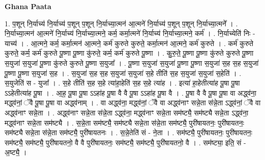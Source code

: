 \documentclass[17pt]{extarticle}
\begin{document}
\textbf{Ghana Paata } \newline

1. प॒शून् नि॒र्याच्य॑ नि॒र्याच्य॑ प॒शून् प॒शून् नि॒र्याच्या॒त्मन॑ आ॒त्मने॑ नि॒र्याच्य॑ प॒शून् प॒शून् नि॒र्याच्या॒त्मने᳚ । . नि॒र्याच्या॒त्मन॑ आ॒त्मने॑ नि॒र्याच्य॑ नि॒र्याच्या॒त्मने॒ कर्म॒ कर्मा॒त्मने॑ नि॒र्याच्य॑ नि॒र्याच्या॒त्मने॒ कर्म॑ । . नि॒र्याच्येति॑ निः - याच्य॑ । . आ॒त्मने॒ कर्म॒ कर्मा॒त्मन॑ आ॒त्मने॒ कर्म॑ कुरुते कुरुते॒ कर्मा॒त्मन॑ आ॒त्मने॒ कर्म॑ कुरुते । . कर्म॑ कुरुते कुरुते॒ कर्म॒ कर्म॑ कुरुते पू॒ष्णा पू॒ष्णा कु॑रुते॒ कर्म॒ कर्म॑ कुरुते पू॒ष्णा । . कु॒रु॒ते॒ पू॒ष्णा पू॒ष्णा कु॑रुते कुरुते पू॒ष्णा स॒युजा॑ स॒युजा॑ पू॒ष्णा कु॑रुते कुरुते पू॒ष्णा स॒युजा᳚ । . पू॒ष्णा स॒युजा॑ स॒युजा॑ पू॒ष्णा पू॒ष्णा स॒युजा॑ स॒ह स॒ह स॒युजा॑ पू॒ष्णा पू॒ष्णा स॒युजा॑ स॒ह । . स॒युजा॑ स॒ह स॒ह स॒युजा॑ स॒युजा॑ स॒हे तीति॑ स॒ह स॒युजा॑ स॒युजा॑ स॒हेति॑ । . स॒युजेति॑ स - युजा᳚ । . स॒हे तीति॑ स॒ह स॒हे त्या॑हा॒हेति॑ स॒ह स॒हे त्या॑ह । . इत्या॑ हा॒हेतीत्या॑ह पू॒षा पू॒षा ऽऽहेतीत्या॑ह पू॒षा । . आ॒ह॒ पू॒षा पू॒षा ऽऽहा॑ह पू॒षा वै वै पू॒षा ऽऽहा॑ह पू॒षा वै । . पू॒षा वै वै पू॒षा पू॒षा वा अद्ध्व॑ना॒ मद्ध्व॑नां॒ ॅवै पू॒षा पू॒षा वा अद्ध्व॑नाम् । . वा अद्ध्व॑ना॒ मद्ध्व॑नां॒ ॅवै वा अद्ध्व॑नाꣳ सन्ने॒ता स॑न्ने॒ता ऽद्ध्व॑नां॒ ॅवै वा अद्ध्व॑नाꣳ सन्ने॒ता । . अद्ध्व॑नाꣳ सन्ने॒ता स॑न्ने॒ता ऽद्ध्व॑ना॒ मद्ध्व॑नाꣳ सन्ने॒ता सम॑ष्ट्यै॒ सम॑ष्ट्यै सन्ने॒ता ऽद्ध्व॑ना॒ मद्ध्व॑नाꣳ सन्ने॒ता सम॑ष्ट्यै । . स॒न्ने॒ता सम॑ष्ट्यै॒ सम॑ष्ट्यै सन्ने॒ता स॑न्ने॒ता सम॑ष्ट्यै॒ पुरी॑षायतनः॒ पुरी॑षायतनः॒ सम॑ष्ट्यै सन्ने॒ता स॑न्ने॒ता सम॑ष्ट्यै॒ पुरी॑षायतनः । . स॒न्ने॒तेति॑ सं - ने॒ता । . सम॑ष्ट्यै॒ पुरी॑षायतनः॒ पुरी॑षायतनः॒ सम॑ष्ट्यै॒ सम॑ष्ट्यै॒ पुरी॑षायतनो॒ वै वै पुरी॑षायतनः॒ सम॑ष्ट्यै॒ सम॑ष्ट्यै॒ पुरी॑षायतनो॒ वै । . सम॑ष्ट्या॒ इति॒ सं - अ॒ष्ट्यै॒ । \newline
\end{document}
